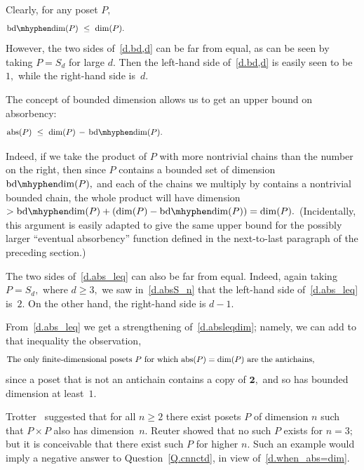\documentclass{amsart}
\numberwithin{equation}{section}
\numberwithin{theorem}{section}
\renewcommand{\r}{\mathrm}
\newcommand{\abs}{\r{abs}}
\newcommand{\2}{\mathbf{2}}
\begin{document}
Clearly, for any poset $P,$
%
\begin{equation}\begin{minipage}[c]{35pc}\label{d.bd,d}
$\r{bd\mhyphen dim}(P)\ \leq\ \dim(P).$
\end{minipage}\end{equation}
%
However, the two sides  of~\eqref{d.bd,d} can be far from equal, as
can be seen by taking $P=S_d$ for large $d.$
Then the left-hand side of~\eqref{d.bd,d}
is easily seen to be~$1,$ while the right-hand side is~$d.$

The concept of bounded
dimension allows us to get an upper bound on absorbency:
%
\begin{equation}\begin{minipage}[c]{35pc}\label{d.abs_leq}
$\r{abs}(P)\ \leq\ \dim(P)\,-\,\r{bd\mhyphen dim}(P).$
\end{minipage}\end{equation}

Indeed, if we take the product of $P$ with more
nontrivial chains than the number on the right,
then since $P$ contains a bounded set of dimension
$\r{bd\mhyphen dim}(P),$ and each of the chains we multiply by contains
a nontrivial bounded chain, the whole product will have dimension
$>\r{bd\mhyphen dim}(P) + (\dim(P)-\r{bd\mhyphen dim}(P))=\dim(P).$
(Incidentally, this argument is easily adapted to give the same upper
bound for the possibly larger ``eventual absorbency'' function
defined in the next-to-last paragraph of the preceding section.)

The two sides of~\eqref{d.abs_leq} can also be far from equal.
Indeed, again taking $P=S_d,$ where $d\geq 3,$
we saw in~\eqref{d.absS_n} that
the left-hand side of~\eqref{d.abs_leq} is~$2.$
On the other hand, the right-hand side is $d-1.$

From~\eqref{d.abs_leq} we get a strengthening
of~\eqref{d.absleqdim}; namely, we can add
to that inequality the observation,
%
\begin{equation}\begin{minipage}[c]{35pc}\label{d.when_abs=dim}
The only finite-dimensional posets $P$ for which
$\abs(P)=\dim(P)$ are the antichains,
%
\end{minipage}\end{equation}
%
since a poset that is not an antichain contains a copy of $\2,$
and so has bounded dimension at least~$1.$

Trotter~\cite[Conjecture~2]{Trotter89} suggested that
for all $n\geq 2$ there exist posets $P$ of dimension
$n$ such that $P\times P$ also has dimension~$n.$
Reuter \cite[Theorem~13]{KR} showed that no such $P$ exists for $n=3;$
but it is conceivable that there exist such $P$ for higher $n.$
Such an example would imply a negative answer to
Question~\ref{Q.cnnctd}, in view of~\eqref{d.when_abs=dim}.
\end{document}
